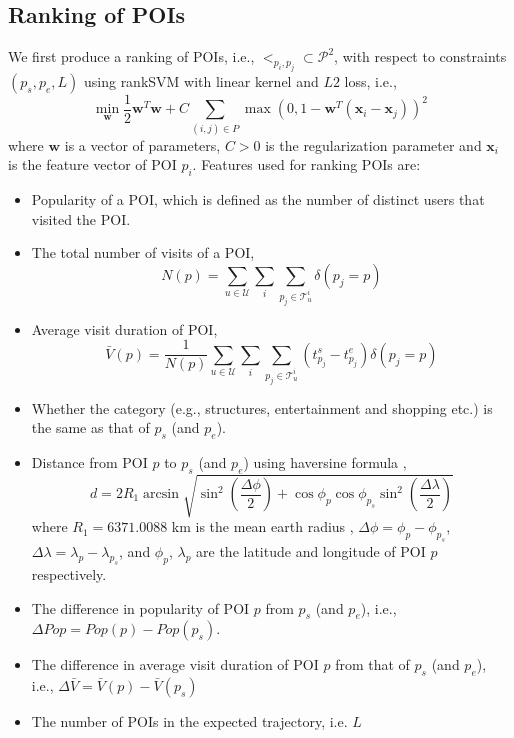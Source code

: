 \documentclass{sig-alternate-05-2015}
\begin{document}
\subsection{Ranking of POIs}
\label{method:ranking}
We first produce a ranking of POIs, i.e., $<_{p_i, p_j} \subset \mathcal{P}^2$,
with respect to constraints $(p_s, p_e, L)$ 
using rankSVM with linear kernel and $L2$ loss\cite{lranksvm}, 
i.e.,
\begin{displaymath}
\min_{\mathbf{w}} \frac{1}{2} \mathbf{w}^T \mathbf{w} +
                  C \sum_{(i, j) \in P} \max \left( 0, 1 - \mathbf{w}^T (\mathbf{x}_i - \mathbf{x}_j) \right)^2
\end{displaymath}
where $\mathbf{w}$ is a vector of parameters, 
$C > 0$ is the regularization parameter and 
$\mathbf{x}_i$ is the feature vector of POI $p_i$.
Features used for ranking POIs are:
\begin{itemize}
\item Popularity of a POI, which is defined as the number of distinct users that visited the POI\cite{ht10}.
\item The total number of visits of a POI,
      \begin{displaymath}
          N(p) = \sum_{u \in \mathcal{U}} \sum_i \sum_{p_j \in \mathcal{T}_u^i} \delta(p_j = p)
      \end{displaymath}
\item Average visit duration of POI\cite{ijcai15},
      \begin{displaymath}
          \bar{V}(p) = \frac{1}{N(p)} \sum_{u \in \mathcal{U}} \sum_i \sum_{p_j \in \mathcal{T}_u^i} (t_{p_j}^s - t_{p_j}^e) \delta(p_j = p)
      \end{displaymath}
\item Whether the category (e.g., structures, entertainment and shopping etc.) is the same as that of $p_s$ (and $p_e$).
\item Distance from POI $p$ to $p_s$ (and $p_e$) using haversine formula \cite{wiki_haversine},
      \begin{displaymath}
      d = 2 R_1 \arcsin \sqrt{ \sin^2 \left( \frac{\Delta \phi}{2} \right) + 
           \cos \phi_p \cos \phi_{p_s} \sin^2 \left( \frac{\Delta \lambda}{2} \right) }
      \end{displaymath}
            where $R_1 = 6371.0088$ km is the mean earth radius \cite{wiki_earth_radius}, 
            $\Delta \phi = \phi_p - \phi_{p_s}$, $\Delta \lambda = \lambda_p - \lambda_{p_s}$,
            and $\phi_p$, $\lambda_p$ are the latitude and longitude of POI $p$ respectively.
\item The difference in popularity of POI $p$ from $p_s$ (and $p_e$),
      i.e., $\Delta Pop = Pop(p) - Pop(p_s)$.
\item The difference in average visit duration of POI $p$ from that of $p_s$ (and $p_e$),
      i.e., $\Delta \bar{V} = \bar{V}(p) - \bar{V}(p_s)$
\item The number of POIs in the expected trajectory, i.e. $L$
\end{itemize}
\end{document}
